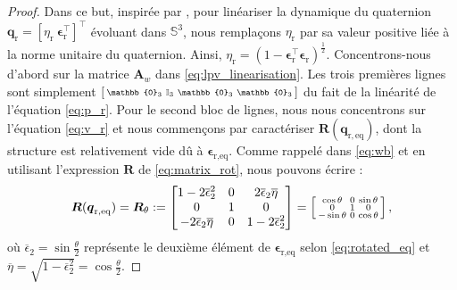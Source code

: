 \begin{proof}
Dans ce but, inspirée par \cite[Proof of Lemma 1]{tregouetHal-01760720}, pour linéariser la dynamique du quaternion $\boldsymbol{q}_{\text{r}} = \left[ \eta_{\text{r}} ~ \boldsymbol{\epsilon}_{\text{r}}^\top \right]^\top$ évoluant dans ${\mathbb S}^3$, nous remplaçons  $\eta_{\text{r}}$ par sa valeur positive liée à la norme unitaire du quaternion. Ainsi, $\eta_{\text{r}} = (1- \boldsymbol{\epsilon}_{\text{r}}^\top \boldsymbol{\epsilon}_{\text{r}})^\frac{1}{2}$.
Concentrons-nous d'abord sur la matrice $\boldsymbol{A}_w$ dans \eqref{eq:lpv_linearisation}. Les trois premières lignes sont simplement $\smallmat{\mathbb{0}_{3} & \mathbb{I}_{3} & \mathbb{0}_{3} &\mathbb{0}_{3}}$ du fait de la linéarité de l'équation \eqref{eq:p_r}. 
Pour le second bloc de lignes, nous nous concentrons sur l'équation \eqref{eq:v_r} et nous commençons par caractériser $\boldsymbol{R}(\boldsymbol{q}_{\mathrm{r,eq}})$, dont la structure est relativement vide dû à $\boldsymbol{\epsilon}_{\text{r,eq}}$. Comme rappelé dans \eqref{eq:wb} et en utilisant l'expression $\boldsymbol{R}$ de \eqref{eq:matrix_rot}, nous pouvons écrire :
\begin{align*}
    \boldsymbol{R}(\boldsymbol{q}_{\mathrm{r,eq}\textbf{}})= \boldsymbol{R}_\theta :=
     \begin{bmatrix}1-2\overline \epsilon_{2}^{2} & 0 & 2\overline\epsilon_{2} \overline{\eta} \\ 0 & 1 & 0 \\ -2\overline\epsilon_{2} \overline{\eta} & 0 & 1-2\overline\epsilon_{2}^{2} \end{bmatrix}
    = \left[ \begin{smallmatrix} \cos \theta & 0 & \sin \theta \\ 0 & 1 & 0 \\ -\sin \theta & 0 & \cos \theta  \end{smallmatrix} \right],
\end{align*}
où $\overline \epsilon_{2} = \sin{\frac{\theta}{2}}$ représente le deuxième élément de $\boldsymbol{\epsilon}_{\text{r,eq}}$ selon \eqref{eq:rotated_eq} et $ \overline{\eta} = \sqrt{1-\overline \epsilon_{2}^{2}} = \cos{\frac{\theta}{2}}$.


\end{proof}
